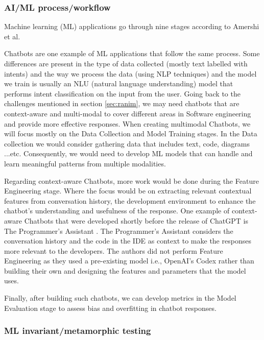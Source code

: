 \documentclass[10pt, a4paper]{article}
\begin{document}
\subsubsection{AI/ML process/workflow}
Machine learning (ML) applications go through nine stages according to Amershi et al.  

Chatbots are one example of ML applications that follow the same process. Some differences are present in the type of data collected (mostly text labelled with intents) and the way we process the data (using NLP techniques) and the model we train is usually an NLU (natural language understanding) model that performs intent classification on the input from the user.
Going back to the challenges mentioned in section \ref{sec:ranim}, we may need chatbots that are context-aware and multi-modal to cover different areas in Software engineering and provide more effective responses. When creating multimodal Chatbots, we will focus mostly on the Data Collection and Model Training stages. In the Data collection we would consider gathering data that includes text, code, diagrams ...etc. Consequently, we would need to develop ML models that can handle and learn meaningful patterns from multiple modalities.

Regarding context-aware Chatbots, more work would be done during the Feature Engineering stage. Where the focus would be on extracting relevant contextual features from conversation history, the development environment to enhance the chatbot's understanding and usefulness of the response. One example of context-aware Chatbots that were developed shortly before the release of ChatGPT is The Programmer's Assistant \cite{ross2023programmer}. The Programmer's Assistant considers the conversation history and the code in the IDE as context to make the responses more relevant to the developers. The authors did not perform Feature Engineering as they used a pre-existing model i.e., OpenAI's Codex rather than building their own and designing the features and parameters that the model uses. 

Finally, after building such chatbots, we can develop metrics in the Model Evaluation stage to assess bias and overfitting in chatbot responses.


\subsubsection{ML invariant/metamorphic testing}
\end{document}
